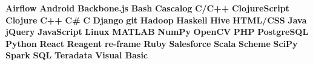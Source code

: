 \setlength{\parindent}{0pt}

\newcommand{\skill}{\textbf}
\newcommand{\skills}[2]{
  \item #2 #1
}

\def\div{\,\textbar{}\,}

\usepackage{xspace}


\newcommand{\lang}[2]{\expandafter\def\csname #1\endcsname{\skill{#2}\xspace}}

\lang{airflow}{Airflow}
\lang{android}{Android}
\lang{backbone}{Backbone.js}
\lang{bash}{Bash}
\lang{cascalog}{Cascalog}
\lang{ccpp}{C/C++}
\lang{clojurescript}{ClojureScript}
\lang{clojure}{Clojure}
\lang{cpp}{C++}
\lang{csh}{C\#}
\lang{c}{C}
\lang{django}{Django}
\lang{git}{git}
\lang{hadoop}{Hadoop}
\lang{haskell}{Haskell}
\lang{hive}{Hive}
\lang{html}{HTML/CSS}
\lang{java}{Java}
\lang{jquery}{jQuery}
\lang{js}{JavaScript}
\lang{linux}{Linux}
\lang{matlab}{MATLAB}
\lang{numpy}{NumPy}
\lang{opencv}{OpenCV}
\lang{php}{PHP}
\lang{postgres}{PostgreSQL}
\lang{python}{Python}
\lang{react}{React}
\lang{reagent}{Reagent}
\lang{reframe}{re-frame}
\lang{ruby}{Ruby}
\lang{salesforce}{Salesforce}
\lang{scala}{Scala}
\lang{scheme}{Scheme}
\lang{scipy}{SciPy}
\lang{spark}{Spark}
\lang{sql}{SQL}
\lang{teradata}{Teradata}
\lang{visb}{Visual Basic}
